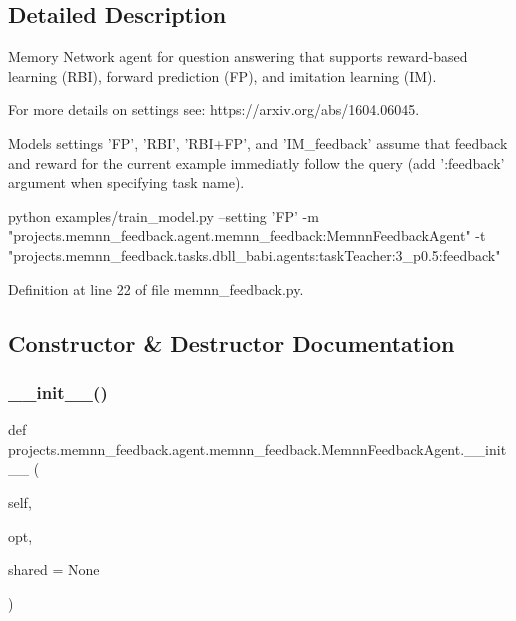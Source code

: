 \subsection{Detailed Description}
\begin{DoxyVerb}Memory Network agent for question answering that supports reward-based learning
(RBI), forward prediction (FP), and imitation learning (IM).

For more details on settings see: https://arxiv.org/abs/1604.06045.

Models settings 'FP', 'RBI', 'RBI+FP', and 'IM_feedback' assume that
feedback and reward for the current example immediatly follow the query
(add ':feedback' argument when specifying task name).

python examples/train_model.py --setting 'FP'
-m "projects.memnn_feedback.agent.memnn_feedback:MemnnFeedbackAgent"
-t "projects.memnn_feedback.tasks.dbll_babi.agents:taskTeacher:3_p0.5:feedback"
\end{DoxyVerb}
 

Definition at line 22 of file memnn\+\_\+feedback.\+py.



\subsection{Constructor \& Destructor Documentation}
\mbox{\label{classprojects_1_1memnn__feedback_1_1agent_1_1memnn__feedback_1_1MemnnFeedbackAgent_a08f6869824b3663c1cb76206daa07942}} 
\subsubsection{\texorpdfstring{\+\_\+\+\_\+init\+\_\+\+\_\+()}{\_\_init\_\_()}}
{\footnotesize\ttfamily def projects.\+memnn\+\_\+feedback.\+agent.\+memnn\+\_\+feedback.\+Memnn\+Feedback\+Agent.\+\_\+\+\_\+init\+\_\+\+\_\+ (\begin{DoxyParamCaption}\item[{}]{self,  }\item[{}]{opt,  }\item[{}]{shared = {\ttfamily None} }\end{DoxyParamCaption})}



